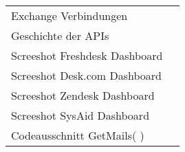 \documentclass[fontsize=12pt]{scrartcl}
\begin{document}
\begin{flushleft}
\begin{tabularx}{\textwidth}{Xr}
	Exchange Verbindungen \dotfill   &   \pageref{Exchange_Verbindungen}\\
	Geschichte der APIs \dotfill   &   \pageref{API_Geschichte}\\
	Screeshot Freshdesk Dashboard \dotfill   &   \pageref{Freshdesk}\\
	Screeshot Desk.com Dashboard  \dotfill   &   \pageref{Deskcom}\\
	Screeshot Zendesk Dashboard  \dotfill   &   \pageref{Zendesk}\\
	Screeshot SysAid Dashboard  \dotfill   &   \pageref{SysAid}\\
	Codeausschnitt GetMails( )  \dotfill   &   \pageref{Codeausschnitt}\\
\end{tabularx}
\end{flushleft}

\newpage



\newpage






\newpage
 
\end{document}
